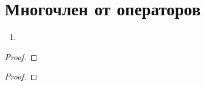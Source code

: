\documentclass[main]{subfiles}
\begin{document}
\chapter{Многочлен от операторов}
\begin{proposition}
    \begin{enumerate}
        \item
    \end{enumerate}
\end{proposition}

\begin{proof}

\end{proof}

\begin{corollary}

\end{corollary}

\begin{proof}

\end{proof}
\end{document}
